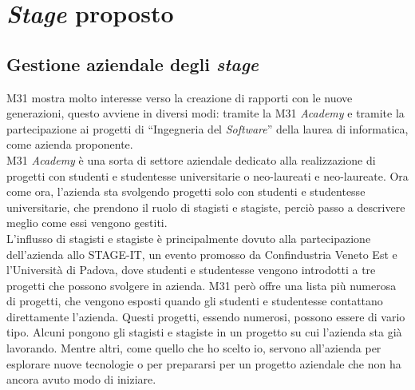 \chapter{\textit{Stage} proposto}
\label{chap:stage-proposto}

\section{Gestione aziendale degli \textit{stage}}\label{sec:stage-management}\noindent
M31 mostra molto interesse verso la creazione di rapporti con le nuove generazioni, questo avviene in diversi modi: tramite la M31 \textit{Academy} e tramite la partecipazione ai progetti di ``Ingegneria del \textit{Software}'' della laurea di informatica, come azienda proponente.\\
M31 \textit{Academy} è una sorta di settore aziendale dedicato alla realizzazione di progetti con studenti e studentesse universitarie o neo-laureati e neo-laureate. Ora come ora, l'azienda sta svolgendo progetti solo con studenti e studentesse universitarie, che prendono il ruolo di stagisti e stagiste, perciò passo a descrivere meglio come essi vengono gestiti.\\
L'influsso di stagisti e stagiste è principalmente dovuto alla partecipazione dell'azienda allo STAGE-IT, un evento promosso da Confindustria Veneto Est e l'Università di Padova, dove studenti e studentesse vengono introdotti a tre progetti che possono svolgere in azienda. M31 però offre una lista più numerosa di progetti, che vengono esposti quando gli studenti e studentesse contattano direttamente l'azienda.
Questi progetti, essendo numerosi, possono essere di vario tipo.
Alcuni pongono gli stagisti e stagiste in un progetto su cui l'azienda sta già lavorando.
Mentre altri, come quello che ho scelto io, servono all'azienda per esplorare nuove tecnologie o per prepararsi per un progetto aziendale che non ha ancora avuto modo di iniziare.

